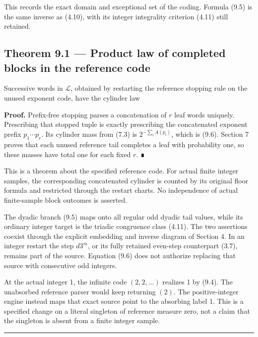 This records the exact domain and exceptional set of the coding. Formula
(9.5) is the same inverse as (4.10), with its integer integrality
criterion (4.11) still retained.

\subsection{Theorem 9.1 --- Product law of completed blocks in the
reference code}

Successive words in \(\mathcal L\), obtained by restarting the reference
stopping rule on the unused exponent code, have the cylinder law


\textbf{Proof.} Prefix-free stopping parses a concatenation of \(r\)
leaf words uniquely. Prescribing that stopped tuple is exactly
prescribing the concatenated exponent prefix \(p_1\cdots p_r\). Its
cylinder mass from (7.3) is \(2^{-\sum_i A(p_i)}\), which is (9.6).
Section 7 proves that each unused reference tail completes a leaf with
probability one, so these masses have total one for each fixed \(r\). ∎

This is a theorem about the specified reference code. For actual finite
integer samples, the corresponding concatenated cylinder is counted by
its original floor formula and restricted through the restart charts. No
independence of actual finite-sample block outcomes is asserted.

The dyadic branch (9.5) maps onto all regular odd dyadic tail values,
while its ordinary integer target is the triadic congruence class
(4.11). The two assertions coexist through the explicit embedding and
inverse diagram of Section 4. In an integer restart the step \(d3^m\),
or its fully retained even-step counterpart (3.7), remains part of the
source. Equation (9.6) does not authorize replacing that source with
consecutive odd integers.

At the actual integer 1, the infinite code \((2,2,\ldots)\) realizes 1
by (9.4). The unabsorbed reference parser would keep returning \((2)\).
The positive-integer engine instead maps that exact source point to the
absorbing label 1. This is a specified change on a literal singleton of
reference measure zero, not a claim that the singleton is absent from a
finite integer sample.

\begin{center}\rule{0.5\linewidth}{0.5pt}\end{center}

